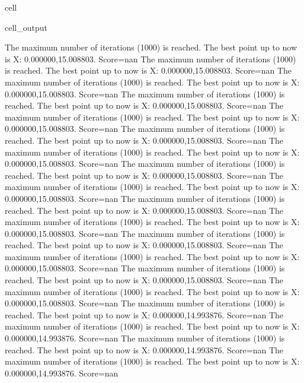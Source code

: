 \documentclass[letterpaper,10pt,english]{jupyterBook}
\begin{document}
\begin{sphinxuseclass}{cell}
\begin{sphinxVerbatimOutput}
\begin{sphinxuseclass}{cell_output}
\begin{sphinxVerbatim}[commandchars=\\\{\}]
The maximum number of iterations (1000) is reached. The best point up to now is X: \PYGZob{}0.000000,15.008803\PYGZcb{}. Score=\PYGZhy{}nan
The maximum number of iterations (1000) is reached. The best point up to now is X: \PYGZob{}0.000000,15.008803\PYGZcb{}. Score=\PYGZhy{}nan
The maximum number of iterations (1000) is reached. The best point up to now is X: \PYGZob{}0.000000,15.008803\PYGZcb{}. Score=\PYGZhy{}nan
The maximum number of iterations (1000) is reached. The best point up to now is X: \PYGZob{}0.000000,15.008803\PYGZcb{}. Score=\PYGZhy{}nan
The maximum number of iterations (1000) is reached. The best point up to now is X: \PYGZob{}0.000000,15.008803\PYGZcb{}. Score=\PYGZhy{}nan
The maximum number of iterations (1000) is reached. The best point up to now is X: \PYGZob{}0.000000,15.008803\PYGZcb{}. Score=\PYGZhy{}nan
The maximum number of iterations (1000) is reached. The best point up to now is X: \PYGZob{}0.000000,15.008803\PYGZcb{}. Score=\PYGZhy{}nan
The maximum number of iterations (1000) is reached. The best point up to now is X: \PYGZob{}0.000000,15.008803\PYGZcb{}. Score=\PYGZhy{}nan
The maximum number of iterations (1000) is reached. The best point up to now is X: \PYGZob{}0.000000,15.008803\PYGZcb{}. Score=\PYGZhy{}nan
The maximum number of iterations (1000) is reached. The best point up to now is X: \PYGZob{}0.000000,15.008803\PYGZcb{}. Score=\PYGZhy{}nan
The maximum number of iterations (1000) is reached. The best point up to now is X: \PYGZob{}0.000000,15.008803\PYGZcb{}. Score=\PYGZhy{}nan
The maximum number of iterations (1000) is reached. The best point up to now is X: \PYGZob{}0.000000,15.008803\PYGZcb{}. Score=\PYGZhy{}nan
The maximum number of iterations (1000) is reached. The best point up to now is X: \PYGZob{}0.000000,15.008803\PYGZcb{}. Score=\PYGZhy{}nan
The maximum number of iterations (1000) is reached. The best point up to now is X: \PYGZob{}0.000000,15.008803\PYGZcb{}. Score=\PYGZhy{}nan
The maximum number of iterations (1000) is reached. The best point up to now is X: \PYGZob{}0.000000,15.008803\PYGZcb{}. Score=\PYGZhy{}nan
The maximum number of iterations (1000) is reached. The best point up to now is X: \PYGZob{}0.000000,14.993876\PYGZcb{}. Score=\PYGZhy{}nan
The maximum number of iterations (1000) is reached. The best point up to now is X: \PYGZob{}0.000000,14.993876\PYGZcb{}. Score=\PYGZhy{}nan
The maximum number of iterations (1000) is reached. The best point up to now is X: \PYGZob{}0.000000,14.993876\PYGZcb{}. Score=\PYGZhy{}nan
The maximum number of iterations (1000) is reached. The best point up to now is X: \PYGZob{}0.000000,14.993876\PYGZcb{}. Score=\PYGZhy{}nan

\end{sphinxVerbatim}
\end{sphinxuseclass}
\end{sphinxVerbatimOutput}
\end{sphinxuseclass}
\end{document}
